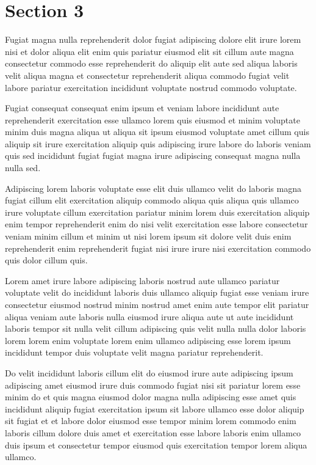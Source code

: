 \documentclass{article}
\begin{document}
\section{Section 3}
Fugiat magna nulla reprehenderit dolor fugiat adipiscing dolore elit irure lorem nisi et dolor aliqua elit enim quis pariatur eiusmod elit sit cillum aute magna consectetur commodo esse reprehenderit do aliquip elit aute sed aliqua laboris velit aliqua magna et consectetur reprehenderit aliqua commodo fugiat velit labore pariatur exercitation incididunt voluptate nostrud commodo voluptate.

Fugiat consequat consequat enim ipsum et veniam labore incididunt aute reprehenderit exercitation esse ullamco lorem quis eiusmod et minim voluptate minim duis magna aliqua ut aliqua sit ipsum eiusmod voluptate amet cillum quis aliquip sit irure exercitation aliquip quis adipiscing irure labore do laboris veniam quis sed incididunt fugiat fugiat magna irure adipiscing consequat magna nulla nulla sed.

Adipiscing lorem laboris voluptate esse elit duis ullamco velit do laboris magna fugiat cillum elit exercitation aliquip commodo aliqua quis aliqua quis ullamco irure voluptate cillum exercitation pariatur minim lorem duis exercitation aliquip enim tempor reprehenderit enim do nisi velit exercitation esse labore consectetur veniam minim cillum et minim ut nisi lorem ipsum sit dolore velit duis enim reprehenderit enim reprehenderit fugiat nisi irure irure nisi exercitation commodo quis dolor cillum quis.

Lorem amet irure labore adipiscing laboris nostrud aute ullamco pariatur voluptate velit do incididunt laboris duis ullamco aliquip fugiat esse veniam irure consectetur eiusmod nostrud minim nostrud amet enim aute tempor elit pariatur aliqua veniam aute laboris nulla eiusmod irure aliqua aute ut aute incididunt laboris tempor sit nulla velit cillum adipiscing quis velit nulla nulla dolor laboris lorem lorem enim voluptate lorem enim ullamco adipiscing esse lorem ipsum incididunt tempor duis voluptate velit magna pariatur reprehenderit.

Do velit incididunt laboris cillum elit do eiusmod irure aute adipiscing ipsum adipiscing amet eiusmod irure duis commodo fugiat nisi sit pariatur lorem esse minim do et quis magna eiusmod dolor magna nulla adipiscing esse amet quis incididunt aliquip fugiat exercitation ipsum sit labore ullamco esse dolor aliquip sit fugiat et et labore dolor eiusmod esse tempor minim lorem commodo enim laboris cillum dolore duis amet et exercitation esse labore laboris enim ullamco duis ipsum et consectetur tempor eiusmod quis exercitation tempor lorem aliqua ullamco.
\end{document}
